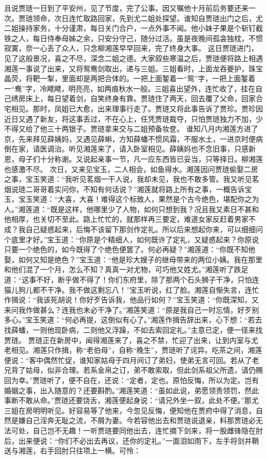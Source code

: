 \documentclass[12pt,oneside]{book}
\begin{document}
且说贾琏一日到了平安州，见了节度，完了公事。因又嘱他十月前后务要还来一次。贾琏领命，次日连忙取路回家，先到尤二姐处探望。谁知自贾琏出门之后，尤二姐操持家务，十分谨肃，每日关门合户，一点外事不闻。他小妹子果是个斩钉截铁之人，每日侍奉母姊之余，只安分守己，随分过活。虽是夜晚间孤衾独枕，不惯寂寞，奈一心丢了众人，只念柳湘莲早早回来，完了终身大事。
这日贾琏进门，见了这般景况，喜之不尽，深念二姐之德。大家叙些寒温之后，贾琏便将路上相遇湘莲一事说了出来，又将鸳鸯剑取出，递与三姐。三姐看时，上面龙吞夔护，珠宝晶荧，将靶一掣，里面却是两把合体的。一把上面錾着一“鸳”字，一把上面錾着一“鸯”字，冷飕飕，明亮亮，如两痕秋水一般。三姐喜出望外，连忙收了，挂在自己绣房床上，每日望着剑，自笑终身有靠。贾琏住了两天，回去覆了父命，回家合宅相见。那时，凤姐已大愈，出来理事行走了。贾琏又将此事告诉了贾珍。贾珍因近日又遇了新友，将这事丢过，不在心上，任凭贾琏裁夺，只怕贾琏独力不加，少不得又给了他三十两银子。贾琏拿来交与二姐预备妆奁。
谁知八月内湘莲方进了京，先来拜见薛姨妈，又遇见薛蝌，方知薛蟠不惯风霜，不服水土，一进京时便病倒在家，请医调治。听见湘莲来了，请入卧室相见。薛姨妈也不念旧事，只感新恩，母子们十分称谢。又说起亲事一节，凡一应东西皆已妥当，只等择日。柳湘莲也感激不尽。
次日，又来见宝玉，二人相会，如鱼得水。湘莲因问贾琏偷娶二房之事，宝玉笑道：“我听见茗烟一干人说，我却未见，我也不敢多管。我又听见茗烟说琏二哥哥着实问你，不知有何话说？”湘莲就将路上所有之事，一概告诉宝玉，宝玉笑道：“大喜，大喜！难得这个标致人，果然是个古今绝色，堪配你之为人。”湘莲道：“既是这样，他哪里少了人物，如何只想到我？况且我又素日不甚和他相厚，也关切不至此。路上忙忙的，就那样再三要定，难道女家反赶着男家不成？我自己疑惑起来，后悔不该留下那剑作定礼。所以后来想起你来，可以细细问个底里才好。”宝玉道：“你原是个精细人，如何既许了定礼，又疑惑起来？你原说只要一个绝色的，如今既得了个绝色便罢了。何必再疑？”湘莲道：“你既不知他娶，如何又知是绝色？”宝玉道：“他是珍大嫂子的继母带来的两位小姨。我在那里和他们混了一个月，怎么不知？真真一对尤物，可巧他又姓尤。”湘莲听了跌足道：“这事不好，断乎做不得了！你们东府里，除了那两个石头狮子干净，只怕连猫儿狗儿都不干净。我不做这剩忘八！”宝玉听说，红了脸。湘莲自惭失言，连忙作揖说：“我该死胡说！你好歹告诉我，他品行如何？”宝玉笑道：“你既深知，又来问我作做甚么？连我也未必干净了。”湘莲笑道：“原是我自己一时忘情，好歹别多心。”宝玉笑道：“何必再提，这倒似有心了。”湘莲作揖告辞出来，心下想：“若去找薛蟠，一则他现卧病，二则他又浮躁，不如去索回定礼。”主意已定，便一径来找贾琏。
贾琏正在新房中，闻得湘莲来了，喜之不禁，忙迎了出来，让到内室与尤老相见。湘莲只作揖，称“老伯母”，自称“晚生”，贾琏听了诧异。吃茶之间，湘莲便说：“客中偶然忙促，谁知家姑母于四月间订了弟妇，使弟无言可回。若从了老兄背了姑母，似非合理。若系金帛之订，弟不敢索取，但此剑系祖父所遗，请仍赐回为幸。”贾琏听了，便不自在，还说：“定者，定也。原怕反悔，所以为定。岂有婚姻之事，出入随意的？还要斟酌。”湘莲笑道：“虽如此说，弟愿领责领罚，然此事断不敢从命。”贾琏还要饶舌，湘莲便起身说：“请兄外坐一叙，此处不便。”那尤三姐在房明明听见。好容易等了他来，今忽见反悔，便知他在贾府中得了消息，自然是嫌自己淫奔无耻之流，不屑为妻。今若容他出去和贾琏说退亲，料那贾琏必无法可处，自己岂不无趣！一听贾琏要同他出去，连忙摘下剑来，将一股雌锋隐在肘后，出来便说：“你们不必出去再议，还你的定礼。”一面泪如雨下，左手将剑并鞘送与湘莲，右手回肘只往项上一横。可怜：
\end{document}
